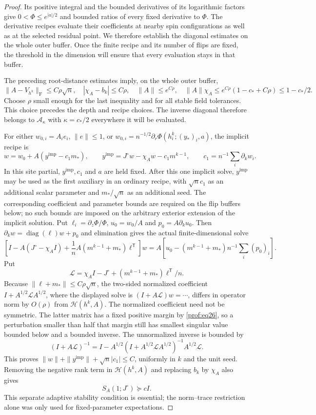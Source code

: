 \begin{proof}
Its positive integral
and the bounded derivatives of its logarithmic factors give
$0<\Phi\le e^{|a|/2}$ and bounded ratios of every fixed derivative to
$\Phi$.  The derivative recipes evaluate their coefficients at nearby spin
configurations as well as at the selected residual point. We therefore
establish the diagonal estimates on the whole outer buffer. Once the
finite recipe and its number of flips are fixed, the threshold in the
dimension will ensure that every evaluation stays in that buffer.

The preceding root-distance estimates imply, on the whole outer buffer,
\begin{equation}\label{prof:implicit-diagonal-buffer}
 \|A-V_{h^k}\|_{\mathrm F}\le C\rho\sqrt n,
 \quad |\chi_A-b_k|\le C\rho,
 \quad \|A\|\le e^{C\rho},
 \quad
 \|A\|\chi_A\le e^{C\rho}(1-c_*+C\rho)\le1-c_*/2.
\end{equation}
Choose $\rho$ small enough for the last inequality and for all stable
field tolerances.  This choice precedes the depth and recipe choices.
The inverse diagonal therefore belongs to $\mathcal A_\kappa$ with
$\kappa=c_*/2$ everywhere it will be evaluated.

For either $w_{0,i}=A_i e_i$, $\|e\|\le1$, or
$w_{0,i}=n^{-1/2}\partial_r\Phi(h_i^k;(y_*)_i,a)$, the implicit recipe is
\[
 w=w_0+A(y^{\mathrm{imp}}-c_1m_*),\qquad
 y^{\mathrm{imp}}=J^\circ w-\chi_A w-c_1m^{k-1},\qquad
 c_1=n^{-1}\sum_i\partial_k w_i.
\]
In this site partial, $y^{\mathrm{imp}},c_1$ and $a$ are held fixed.
After this one implicit solve, $y^{\mathrm{imp}}$ may be used as the
first auxiliary in an ordinary recipe, with $\sqrt n c_1$ as an
additional scalar parameter and $m_*/\sqrt n$ as an additional seed.
The corresponding coefficient and parameter bounds are required on
the flip buffers below; no such bounds are imposed on the arbitrary
exterior extension of the implicit solution.
Put $\ell_i=\partial_z\Phi/\Phi$, $u_0=w_0/A$ and
$p_0=A\partial_k u_0$.  Then $\partial_k w=\operatorname{diag}(\ell)w+p_0$
and elimination gives the actual finite-dimensional solve
\[
 \left[I-A(J^\circ-\chi_AI)
       +\frac1n A(m^{k-1}+m_*)\ell^{\mathsf T}\right]w
 =A\left[u_0-(m^{k-1}+m_*)n^{-1}\sum_i(p_0)_i\right].
\]
Put
\[
 \mathcal L=\chi_AI-J^\circ+
       (m^{k-1}+m_*)\ell^{\mathsf T}/n.
\]
Because $\|\ell+m_*\|\le C\rho\sqrt n$, the two-sided normalized
coefficient \(I+A^{1/2}\mathcal LA^{1/2}\), where the displayed solve is
\((I+A\mathcal L)w=\cdots\), differs in operator norm by \(O(\rho)\)
from \(\mathcal H(h^k,A)\). The normalized coefficient need not
be symmetric. The latter matrix has a fixed positive margin by
\eqref{prof:eq26}, so a perturbation smaller than half that margin
still has smallest singular value bounded below and a bounded
inverse.
The unnormalized inverse is bounded by
\[
 (I+A\mathcal L)^{-1}
 =I-A^{1/2}(I+A^{1/2}\mathcal LA^{1/2})^{-1}
             A^{1/2}\mathcal L.
\]
This proves
$\|w\|+\|y^{\mathrm{imp}}\|+\sqrt n|c_1|\le C$, uniformly in
$k$ and the unit seed.  Removing the negative rank term in
$\mathcal H(h^k,A)$ and replacing $b_k$ by $\chi_A$ also gives
\[
 S_A(1;J^\circ)\succeq cI.
\]
This separate adaptive stability condition is essential; the norm--trace
restriction alone was only used for fixed-parameter expectations.


\end{proof}
